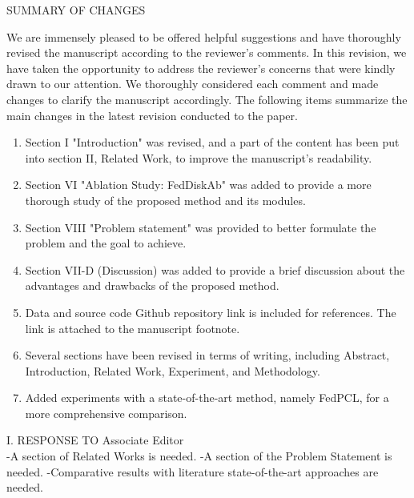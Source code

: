 \fontsize{12}{21}\selectfont
\onecolumn




\centerline{SUMMARY OF CHANGES}


We are immensely pleased to be offered helpful suggestions and have thoroughly revised the manuscript according to the reviewer’s comments. In this revision, we have taken the opportunity to address the reviewer’s concerns that were kindly drawn to our attention. We thoroughly considered each comment and made changes to clarify the manuscript accordingly. The following items summarize the main changes in the latest revision conducted to the paper.

\begin{enumerate}
	
\item Section I "Introduction" was revised, and a part of the content has been put into section II, Related Work, to improve the manuscript's readability. 

\item Section VI "Ablation Study: FedDiskAb" was added to provide a more thorough study of the proposed method and its modules.

\item Section VIII "Problem statement" was provided to better formulate the problem and the goal to achieve. 

\item Section VII-D (Discussion) was added to provide a brief discussion about the advantages and drawbacks of the proposed method.

\item Data and source code Github repository link is included for references. The link is attached to the manuscript footnote.

\item Several sections have been revised in terms of writing, including Abstract, Introduction, Related Work, Experiment, and Methodology. 

\item Added experiments with a state-of-the-art method, namely FedPCL, for a more comprehensive comparison.
	  
\end{enumerate}


\newpage

I. RESPONSE TO Associate Editor
~\\
\color{blue}
-A section of Related Works is needed.
-A section of the Problem Statement is needed.
-Comparative results with literature state-of-the-art approaches are needed.

